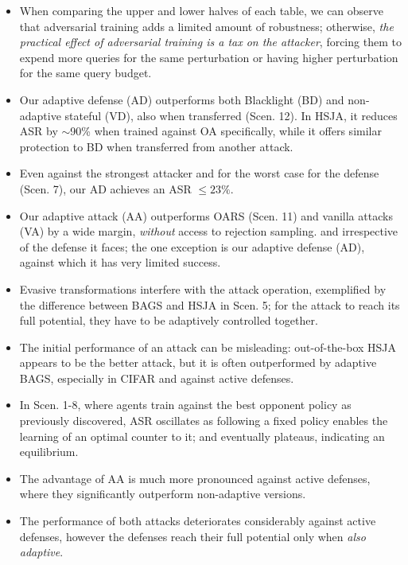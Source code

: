 \begin{itemize}[leftmargin=*]
  \setlength\itemsep{0.15em}
  \item When comparing the upper and lower halves of each table, we can observe that adversarial training adds a limited amount of robustness; otherwise, \emph{the practical effect of adversarial training is a tax on the attacker}, forcing them to expend more queries for the same perturbation or having higher perturbation for the same query budget.
  \item Our adaptive defense (AD) outperforms both Blacklight (BD) and non-adaptive stateful (VD), also when transferred (Scen. 12). In HSJA, it reduces ASR by $\sim$90\% when trained against OA specifically, while it offers similar protection to BD when transferred from another attack.
  \item Even against the strongest attacker and for the worst case for the defense (Scen. 7), our AD achieves an ASR $\leq23\%$.
  \item Our adaptive attack (AA) outperforms OARS (Scen. 11) and vanilla attacks (VA) by a wide margin, \textit{without} access to rejection sampling. and irrespective of the defense it faces; the one exception is our adaptive defense (AD), against which it has very limited success.
  \item Evasive transformations interfere with the attack operation, exemplified by the difference between BAGS and HSJA in Scen. 5; for the attack to reach its full potential, they have to be adaptively controlled together.
  \item The initial performance of an attack can be misleading: out-of-the-box HSJA appears to be the better attack, but it is often outperformed by adaptive BAGS, especially in CIFAR and against active defenses.
  \item In Scen. 1-8, where agents train against the best opponent policy as previously discovered, ASR oscillates as following a fixed policy enables the learning of an optimal counter to it; and eventually plateaus, indicating an equilibrium.
  \item The advantage of AA is much more pronounced against active defenses, where they significantly outperform non-adaptive versions.
  \item The performance of both attacks deteriorates considerably against active defenses, however the defenses reach their full potential only when \emph{also adaptive}.

\end{itemize}
